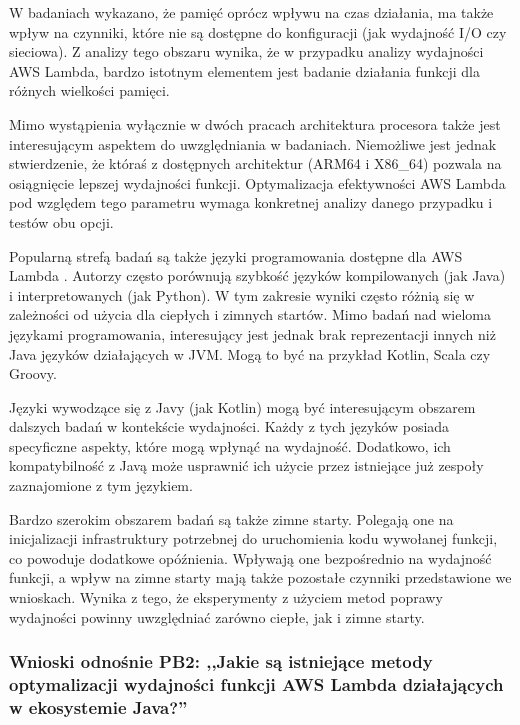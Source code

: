 W badaniach wykazano, że pamięć oprócz wpływu na czas działania, ma także wpływ na czynniki, które nie są dostępne do konfiguracji (jak wydajność I/O czy sieciowa).
Z analizy tego obszaru wynika, że w przypadku analizy wydajności AWS Lambda, bardzo istotnym elementem jest badanie działania funkcji dla różnych wielkości pamięci.

Mimo wystąpienia wyłącznie w dwóch pracach \cite{10.1145/3631295.3631394}\cite{10.1145/3491204.3543506} architektura procesora także jest interesującym aspektem do uwzględniania w badaniach.
Niemożliwe jest jednak stwierdzenie, że któraś z dostępnych architektur (ARM64 i X86\_64) pozwala na osiągnięcie lepszej wydajności funkcji.
Optymalizacja efektywności AWS Lambda pod względem tego parametru wymaga konkretnej analizy danego przypadku i testów obu opcji.

Popularną strefą badań są także języki programowania dostępne dla AWS Lambda \cite{8605773}\cite{Cordingly2020704}\cite{shrestha2019lambda}.
Autorzy często porównują szybkość języków kompilowanych (jak Java) i interpretowanych (jak Python).
W tym zakresie wyniki często różnią się w zależności od użycia dla ciepłych i zimnych startów.
Mimo badań nad wieloma językami programowania, interesujący jest jednak brak reprezentacji innych niż Java języków działających w JVM.
Mogą to być na przykład Kotlin, Scala czy Groovy.

Języki wywodzące się z Javy (jak Kotlin) mogą być interesującym obszarem dalszych badań w kontekście wydajności.
Każdy z tych języków posiada specyficzne aspekty, które mogą wpłynąć na wydajność.
Dodatkowo, ich kompatybilność z Javą może usprawnić ich użycie przez istniejące już zespoły zaznajomione z tym językiem.

Bardzo szerokim obszarem badań są także zimne starty.
Polegają one na inicjalizacji infrastruktury potrzebnej do uruchomienia kodu wywołanej funkcji, co powoduje dodatkowe opóźnienia. 
Wpływają one bezpośrednio na wydajność funkcji, a wpływ na zimne starty mają także pozostałe czynniki przedstawione we wnioskach.
Wynika z tego, że eksperymenty z użyciem metod poprawy wydajności powinny uwzględniać zarówno ciepłe, jak i zimne starty.

\subsubsection*{Wnioski odnośnie PB2: ,,Jakie są istniejące metody optymalizacji wydajności funkcji AWS Lambda działających w ekosystemie Java?''}

